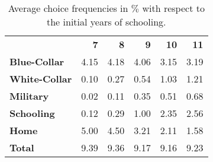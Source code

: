 \begin{ThreePartTable}

	\begin{longtable}[c]{@{}lrrrrr@{}}
		\caption{Average choice frequencies in $\%$ with respect to the initial years of schooling.}
		\label{tab:InitialSchoolingActivity}

		\setlength\extrarowheight{2.5pt}
		
		\\
		\toprule
		
    &	\textbf{7}	&	\textbf{8}	&	\textbf{9}	&	\textbf{10}	&	\textbf{11}	\\ \midrule
		\endfirsthead
\textbf{Blue-Collar}	&	4.15	&	4.18	&	4.06	&	3.15	&	3.19	\\
\textbf{White-Collar}	&	0.10	&	0.27	&	0.54	&	1.03	&	1.21	\\
\textbf{Military}&	0.02	&	0.11	&	0.35	&	0.51	&	0.68	\\
\textbf{Schooling}	&	0.12	&	0.29	&	1.00	&	2.35	&	2.56	\\
\textbf{Home}	&	5.00	&	4.50	&	3.21	&	2.11	&	1.58	\\
\textbf{Total}	&	9.39	&	9.36	&	9.17	&	9.16	&	9.23	\\



  \bottomrule
	\end{longtable}
\end{ThreePartTable}
